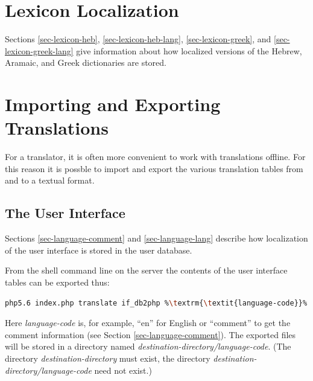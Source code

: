 \documentclass[11pt,oneside,a4paper]{memoir}
\begin{document}
\section{Lexicon Localization}\label{sec-lex-loc}

Sections \ref{sec-lexicon-heb}, \ref{sec-lexicon-heb-lang}, \ref{sec-lexicon-greek}, and
\ref{sec-lexicon-greek-lang} give information about how localized versions of the Hebrew, Aramaic,
and Greek dictionaries are stored.


\section{Importing and Exporting Translations}\label{sec-imp-exp-trans}%
%

For a translator, it is often more convenient to work with translations offline. For this reason it
is possble to import and export the various translation tables from and to a textual format.

\subsection{The User Interface}

Sections \ref{sec-language-comment} and \ref{sec-language-lang} describe how localization of the
user interface is stored in the user database.

From the shell command line on the server the contents of the user interface tables can be exported
thus:

\begin{lstlisting}[language=bash,basicstyle={\ttfamily}]
php5.6 index.php translate if_db2php %\textrm{\textit{language-code}}% %\textrm{\textit{destination-directory}}%
\end{lstlisting}

Here \emph{language-code} is, for example, ``en'' for English or ``comment'' to get the
comment information (see Section \ref{sec-language-comment}). The exported files will be stored in a
directory named
\emph{destination-directory/language-code}. (The directory
\emph{destination-directory} must exist, the directory \emph{destination-directory/language-code}
need not exist.)
\end{document}
